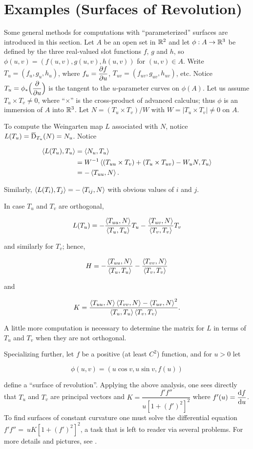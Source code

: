 \documentclass[../main]{subfiles}
\begin{document}
\section{Examples (Surfaces of Revolution)}\label{ch03:s4}
Some general methods for computations with ``parameterized'' surfaces are introduced in this section. Let $A$ be an open set in $\mathbb{R}^2$ and let $\phi : A \to \mathbb{R}^3$ be defined by the three real-valued slot functions $f$, $g$ and $h$, so\newline  $\phi(u, v) = (f(u,v), g(u,v), h(u,v))$ for $(u, v) \in A$. Write $T_u = (f_u, g_u, h_u)$, where $f_u = \dfrac{\partial  f}{\partial  u}$, $T_{uv} = (f_{uv}, g_{uv}, h_{uv})$, etc. Notice $T_u = \phi_\ast \Big(\dfrac{\partial }{\partial  u}\Big)$ is the tangent to the $u$-parameter curves on $\phi(A)$. Let us assume $T_u \times T_v \ne 0$, where ``$\times$'' is the cross-product of advanced calculus; thus $\phi$ is an immersion of $A$ into $\mathbb{R}^3$. Let $N = (T_u \times T_v)/W$ with $W = |T_u \times T_v| \ne 0$ on $A$.

To compute the Weingarten map $L$ associated with $N$, notice $L(T_u) = \covariant_{T_u}(N) = N_u$. Notice

\begin{align*}
\left\langle L(T_u),T_u\right\rangle & = \left\langle N_u,T_u\right\rangle \\ & = W^{-1} \left\langle(T_{uu} \times T_v) + (T_u \times T_{uv}) - W_u N,T_u\right\rangle \\ & = -\left\langle T_{uu},N\right\rangle.
\end{align*}

Similarly, $\left\langle L(T_i),T_j\right\rangle = -\left\langle T_{ij},N\right\rangle$ with obvious values of $i$ and $j$. 

In case $T_u$ and $T_v$ are orthogonal, 

\[
L(T_u) = -\frac {\left\langle T_{u u},N\right\rangle} {\left\langle T_u,T_u\right\rangle} T_u - \frac {\left\langle T_{u v},N\right\rangle} {\left\langle T_v,T_v\right\rangle} T_v
\]

and similarly for $T_v$; hence, 

\[
H = -\frac {\left\langle T_{uu},N\right\rangle} {\left\langle T_u,T_u\right\rangle} - \frac {\left\langle T_{vv},N\right\rangle} {\left\langle T_v,T_v\right\rangle}
\]

and

\[
K = \frac {\left\langle T_{uu},N\right\rangle \left\langle T_{vv},N\right\rangle - \left\langle T_{uv},N\right\rangle^2} {\left\langle T_u,T_u\right\rangle \left\langle T_v,T_v\right\rangle}.
\]

A little more computation is necessary to determine the matrix for $L$ in terms of $T_u$ and $T_v$ when they are not orthogonal.

Specializing further, let $f$ be a positive (at least $C^2$) function, and for $u > 0$ let 

\[
\phi(u, v) = (u \cos v, u \sin v, f(u))
\]

define a ``surface of revolution''. Applying the above analysis, one sees directly that $T_u$ and $T_v$ are principal vectors and $K = \dfrac{f' f''}{u[1 + (f')^2]^2}$ where $f'(u) = \dfrac{\mathrm{d}f}{\mathrm{d}u}$. To find surfaces of constant curvature one must solve the differential equation $f' f'' =\ u K [1 + (f')^2]^2$, a task that is left to reader via several problems. For more details and pictures, see \cite{struik1961lectures}.
\end{document}
